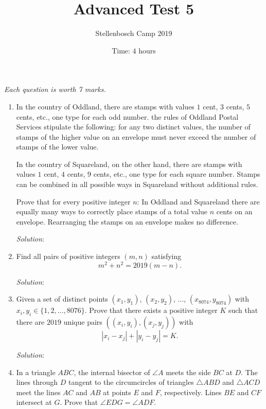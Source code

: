 \documentclass{article}
\title{Advanced Test 5}
\author{Stellenbosch Camp 2019}
\date{Time: $4$ hours}
\begin{document}
\maketitle
\thispagestyle{empty}

\hfill\textit{Each question is worth 7 marks.}

\vfill
\vfill


\begin{enumerate}[1.]

\item %
In the country of Oddland, there are stamps with values $1$ cent, $3$ cents, $5$ cents, etc., one type for each odd number.
the rules of Oddland Postal Services stipulate the following: for any two distinct values, the number of stamps of the higher value on an envelope must never exceed the number of stamps of the lower value.

In the country of Squareland, on the other hand, there are stamps with values $1$ cent, $4$ cents, $9$ cents, etc., one type for each square number.
Stamps can be combined in all possible ways in Squareland without additional rules.

Prove that for every positive integer $n$:
In Oddland and Squareland there are equally many ways to correctly place stamps of a total value $n$ cents on an envelope.
Rearranging the stamps on an envelope makes no difference.

\textit{Solution}:
\vfill

\item %
Find all pairs of positive integers $(m,n)$ satisfying
\[ m^2 +n^2 = 2019(m-n). \]

\textit{Solution}:
\vfill

\item %
Given a set of distinct points $(x_1, y_1)$, $(x_2, y_2)$, $\dots$, $(x_{8074}, y_{8074})$ with $x_i, y_i \in \{1, 2, \dots, 8076\}$.
Prove that there exists a positive integer $K$ such that there are $2019$ unique pairs $( (x_i, y_i), (x_j, y_j) )$ with
\[ |x_i - x_j| + |y_i - y_j| = K. \]

\textit{Solution}:
\vfill

\item %
In a triangle $ABC$, the internal bisector of $\angle A$ meets the side $BC$ at $D$.
The lines through $D$ tangent to the circumcircles of triangles $\triangle ABD$ and $\triangle ACD$ meet the lines $AC$ and $AB$ at points $E$ and $F$, respectively.
Lines $BE$ and $CF$ intersect at $G$.
Prove that $\angle EDG = \angle ADF$.


\end{enumerate}
\end{document}
